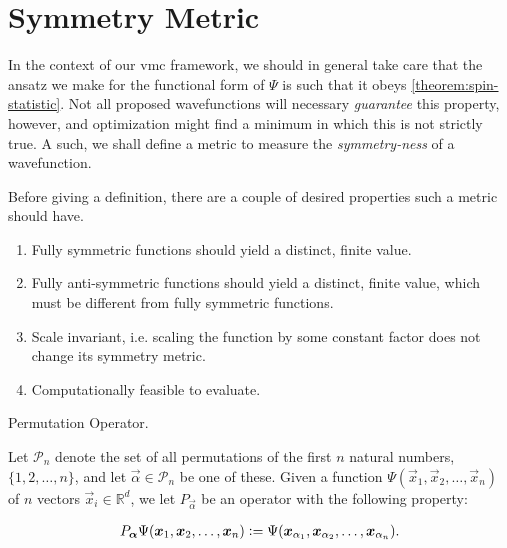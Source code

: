 \documentclass[Thesis.tex]{subfiles}
\begin{document}
\section{Symmetry Metric}
\label{app:symmetry-metric}

In the context of our \gls{vmc} framework, we should in general
take care that the ansatz we make for the functional form of $\Psi$ is such
that it obeys \autoref{theorem:spin-statistic}. Not all proposed wavefunctions
will necessary \emph{guarantee} this property, however, and optimization might
find a minimum in which this is not strictly true. A such, we shall define a metric to
measure the \emph{symmetry-ness} of a wavefunction.

Before giving a definition, there are a couple of desired properties such a
metric should have.

\begin{enumerate}
    \item Fully symmetric functions should yield a distinct, finite value.
    \item Fully anti-symmetric functions should yield a distinct, finite value,
        which must be different from fully symmetric functions.
    \item Scale invariant, i.e. scaling the function by
        some constant factor does not change its symmetry metric.
    \item Computationally feasible to evaluate.
\end{enumerate}

\begin{definition}{Permutation Operator.}

    Let $\mathcal{P}_n$ denote the set of all permutations of the first $n$
    natural numbers, $\{1, 2, \dots, n\}$, and let $\vec\alpha\in \mathcal{P}_n$ be
    one of these. Given a function $\Psi(\vec x_1, \vec x_2,\dots,\vec x_n)$ of $n$
    vectors $\vec x_i\in \mathbb{R}^d$, we let $P_{\vec\alpha}$ be an operator with
    the following property:

    \begin{align}
        P_{\bm{\alpha}}\Psi(\bm{x}_1,\bm{x}_2,\dots,\bm{x}_n)
        \vcentcolon=
        \Psi(\bm{x}_{\alpha_1},\bm{x}_{\alpha_2},\dots,\bm{x}_{\alpha_n}).
    \end{align}
\end{definition}
\end{document}
